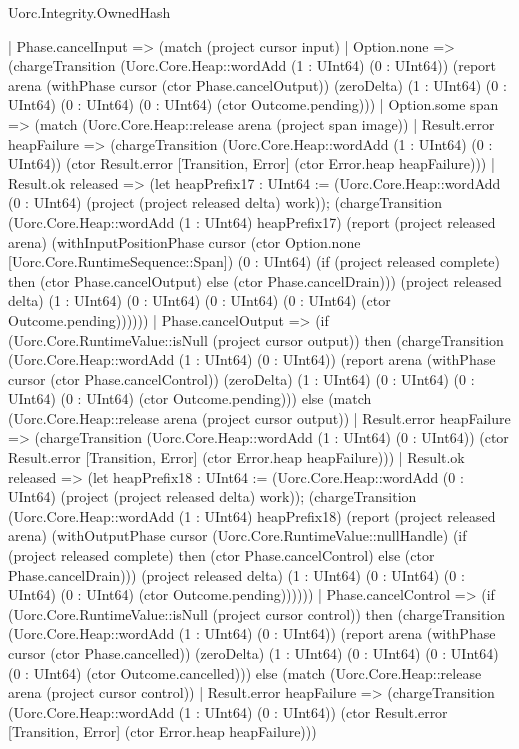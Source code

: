 \begin{lexlean}{Uorc.Integrity.OwnedHash}
\begin{semanticmodule}
{    | Phase.cancelInput => (match (project cursor input)
      | Option.none => (chargeTransition (Uorc.Core.Heap::wordAdd (1 : UInt64) (0 : UInt64)) (report arena (withPhase cursor (ctor Phase.cancelOutput)) (zeroDelta) (1 : UInt64) (0 : UInt64) (0 : UInt64) (0 : UInt64) (ctor Outcome.pending)))
      | Option.some span => (match (Uorc.Core.Heap::release arena (project span image))
        | Result.error heapFailure => (chargeTransition (Uorc.Core.Heap::wordAdd (1 : UInt64) (0 : UInt64)) (ctor Result.error [Transition, Error] (ctor Error.heap heapFailure)))
        | Result.ok released => (let heapPrefix17 : UInt64 := (Uorc.Core.Heap::wordAdd (0 : UInt64) (project (project released delta) work)); (chargeTransition (Uorc.Core.Heap::wordAdd (1 : UInt64) heapPrefix17) (report (project released arena) (withInputPositionPhase cursor (ctor Option.none [Uorc.Core.RuntimeSequence::Span]) (0 : UInt64) (if (project released complete) then (ctor Phase.cancelOutput) else (ctor Phase.cancelDrain))) (project released delta) (1 : UInt64) (0 : UInt64) (0 : UInt64) (0 : UInt64) (ctor Outcome.pending))))))
    | Phase.cancelOutput => (if (Uorc.Core.RuntimeValue::isNull (project cursor output)) then (chargeTransition (Uorc.Core.Heap::wordAdd (1 : UInt64) (0 : UInt64)) (report arena (withPhase cursor (ctor Phase.cancelControl)) (zeroDelta) (1 : UInt64) (0 : UInt64) (0 : UInt64) (0 : UInt64) (ctor Outcome.pending))) else (match (Uorc.Core.Heap::release arena (project cursor output))
      | Result.error heapFailure => (chargeTransition (Uorc.Core.Heap::wordAdd (1 : UInt64) (0 : UInt64)) (ctor Result.error [Transition, Error] (ctor Error.heap heapFailure)))
      | Result.ok released => (let heapPrefix18 : UInt64 := (Uorc.Core.Heap::wordAdd (0 : UInt64) (project (project released delta) work)); (chargeTransition (Uorc.Core.Heap::wordAdd (1 : UInt64) heapPrefix18) (report (project released arena) (withOutputPhase cursor (Uorc.Core.RuntimeValue::nullHandle) (if (project released complete) then (ctor Phase.cancelControl) else (ctor Phase.cancelDrain))) (project released delta) (1 : UInt64) (0 : UInt64) (0 : UInt64) (0 : UInt64) (ctor Outcome.pending))))))
    | Phase.cancelControl => (if (Uorc.Core.RuntimeValue::isNull (project cursor control)) then (chargeTransition (Uorc.Core.Heap::wordAdd (1 : UInt64) (0 : UInt64)) (report arena (withPhase cursor (ctor Phase.cancelled)) (zeroDelta) (1 : UInt64) (0 : UInt64) (0 : UInt64) (0 : UInt64) (ctor Outcome.cancelled))) else (match (Uorc.Core.Heap::release arena (project cursor control))
      | Result.error heapFailure => (chargeTransition (Uorc.Core.Heap::wordAdd (1 : UInt64) (0 : UInt64)) (ctor Result.error [Transition, Error] (ctor Error.heap heapFailure)))
}
\end{semanticmodule}
\end{lexlean}
